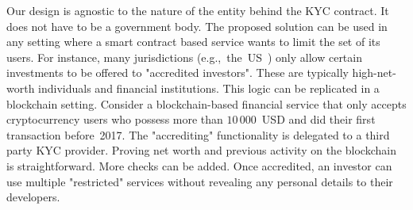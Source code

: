 Our design is agnostic to the nature of the entity behind the KYC contract.
It does not have to be a government body.
The proposed solution can be used in any setting where a smart contract based service wants to limit the set of its users.
For instance, many jurisdictions (e.g.,~the~US~\cite{SEC}) only allow certain investments to be offered to "accredited investors".
These are typically high-net-worth individuals and financial institutions.
This logic can be replicated in a blockchain setting.
Consider a blockchain-based financial service that only accepts cryptocurrency users who possess more than $10\,000$~USD and did their first transaction before~2017.
The "accrediting" functionality is delegated to a third party KYC provider.
Proving net worth and previous activity on the blockchain is straightforward.
More checks can be added.
Once accredited, an investor can use multiple "restricted" services without revealing any personal details to their developers.

